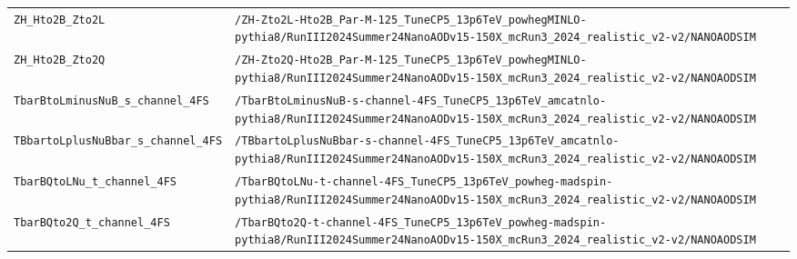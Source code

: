 \begin{longtable}{@{}>{\RaggedRight\arraybackslash}p{} >{\RaggedRight\arraybackslash}p{}@{}}
\addlinespace[2pt]
\texttt{ZH\_\allowbreak{}Hto2B\_\allowbreak{}Zto2L} & \texttt{/\allowbreak{}ZH-\allowbreak{}Zto2L-\allowbreak{}Hto2B\_\allowbreak{}Par-\allowbreak{}M-\allowbreak{}125\_\allowbreak{}TuneCP5\_\allowbreak{}13p6TeV\_\allowbreak{}powhegMINLO-\allowbreak{}pythia8/\allowbreak{}RunIII2024Summer24NanoAODv15-\allowbreak{}150X\_\allowbreak{}mcRun3\_\allowbreak{}2024\_\allowbreak{}realistic\_\allowbreak{}v2-\allowbreak{}v2/\allowbreak{}NANOAODSIM} \\
\addlinespace[2pt]
\texttt{ZH\_\allowbreak{}Hto2B\_\allowbreak{}Zto2Q} & \texttt{/\allowbreak{}ZH-\allowbreak{}Zto2Q-\allowbreak{}Hto2B\_\allowbreak{}Par-\allowbreak{}M-\allowbreak{}125\_\allowbreak{}TuneCP5\_\allowbreak{}13p6TeV\_\allowbreak{}powhegMINLO-\allowbreak{}pythia8/\allowbreak{}RunIII2024Summer24NanoAODv15-\allowbreak{}150X\_\allowbreak{}mcRun3\_\allowbreak{}2024\_\allowbreak{}realistic\_\allowbreak{}v2-\allowbreak{}v2/\allowbreak{}NANOAODSIM} \\
\addlinespace[2pt]
\texttt{TbarBtoLminusNuB\_\allowbreak{}s\_\allowbreak{}channel\_\allowbreak{}4FS} & \texttt{/\allowbreak{}TbarBtoLminusNuB-\allowbreak{}s-\allowbreak{}channel-\allowbreak{}4FS\_\allowbreak{}TuneCP5\_\allowbreak{}13p6TeV\_\allowbreak{}amcatnlo-\allowbreak{}pythia8/\allowbreak{}RunIII2024Summer24NanoAODv15-\allowbreak{}150X\_\allowbreak{}mcRun3\_\allowbreak{}2024\_\allowbreak{}realistic\_\allowbreak{}v2-\allowbreak{}v2/\allowbreak{}NANOAODSIM} \\
\addlinespace[2pt]
\texttt{TBbartoLplusNuBbar\_\allowbreak{}s\_\allowbreak{}channel\_\allowbreak{}4FS} & \texttt{/\allowbreak{}TBbartoLplusNuBbar-\allowbreak{}s-\allowbreak{}channel-\allowbreak{}4FS\_\allowbreak{}TuneCP5\_\allowbreak{}13p6TeV\_\allowbreak{}amcatnlo-\allowbreak{}pythia8/\allowbreak{}RunIII2024Summer24NanoAODv15-\allowbreak{}150X\_\allowbreak{}mcRun3\_\allowbreak{}2024\_\allowbreak{}realistic\_\allowbreak{}v2-\allowbreak{}v2/\allowbreak{}NANOAODSIM} \\
\addlinespace[2pt]
\texttt{TbarBQtoLNu\_\allowbreak{}t\_\allowbreak{}channel\_\allowbreak{}4FS} & \texttt{/\allowbreak{}TbarBQtoLNu-\allowbreak{}t-\allowbreak{}channel-\allowbreak{}4FS\_\allowbreak{}TuneCP5\_\allowbreak{}13p6TeV\_\allowbreak{}powheg-\allowbreak{}madspin-\allowbreak{}pythia8/\allowbreak{}RunIII2024Summer24NanoAODv15-\allowbreak{}150X\_\allowbreak{}mcRun3\_\allowbreak{}2024\_\allowbreak{}realistic\_\allowbreak{}v2-\allowbreak{}v2/\allowbreak{}NANOAODSIM} \\
\addlinespace[2pt]
\texttt{TbarBQto2Q\_\allowbreak{}t\_\allowbreak{}channel\_\allowbreak{}4FS} & \texttt{/\allowbreak{}TbarBQto2Q-\allowbreak{}t-\allowbreak{}channel-\allowbreak{}4FS\_\allowbreak{}TuneCP5\_\allowbreak{}13p6TeV\_\allowbreak{}powheg-\allowbreak{}madspin-\allowbreak{}pythia8/\allowbreak{}RunIII2024Summer24NanoAODv15-\allowbreak{}150X\_\allowbreak{}mcRun3\_\allowbreak{}2024\_\allowbreak{}realistic\_\allowbreak{}v2-\allowbreak{}v2/\allowbreak{}NANOAODSIM} \\

\end{longtable}
